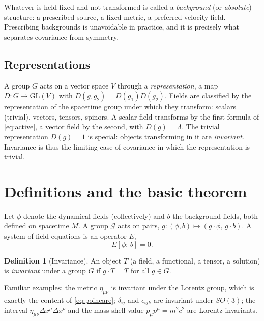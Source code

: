 \documentclass[11pt,a4paper,openany]{book}
\theoremstyle{definition}
\newtheorem{definition}{Definition}[chapter]
\theoremstyle{plain}
\theoremstyle{remark}
\begin{document}
Whatever is held fixed and not transformed is called a \emph{background} (or
\emph{absolute}) structure: a prescribed source, a fixed metric, a preferred
velocity field. Prescribing backgrounds is unavoidable in practice, and it is
precisely what separates covariance from symmetry.

\subsection{Representations}

A group $G$ acts on a vector space $V$ through a \emph{representation},
a map $D\colon G\to \mathrm{GL}(V)$ with $D(g_1g_2)=D(g_1)D(g_2)$.
Fields are classified by the representation of the spacetime group under
which they transform: scalars (trivial), vectors, tensors, spinors. A scalar
field transforms by the first formula of \eqref{eq:active}, a vector field by
the second, with $D(g)=\Lambda$. The trivial representation $D(g)=1$ is
special: objects transforming in it are \emph{invariant}. Invariance is thus
the limiting case of covariance in which the representation is trivial.

\section{Definitions and the basic theorem}
\label{sec:definitions}

Let $\phi$ denote the dynamical fields (collectively) and $b$ the background
fields, both defined on spacetime $M$. A group $\mathcal G$ acts on pairs,
$g\colon(\phi,b)\mapsto(g\cdot\phi,\,g\cdot b)$. A system of field equations
is an operator $E$,
\begin{equation}\label{eq:EOM}
  E[\phi;\,b]=0 .
\end{equation}

\begin{definition}[Invariance]\label{def:invariance}
An object $T$ (a field, a functional, a tensor, a solution) is
\emph{invariant} under a group $G$ if $g\cdot T=T$ for all $g\in G$.
\end{definition}

Familiar examples: the metric $\eta_{\mu\nu}$ is invariant under the
Lorentz group, which is exactly the content of \eqref{eq:poincare}; $\delta_{ij}$
and $\epsilon_{ijk}$ are invariant under $SO(3)$; the interval
$\eta_{\mu\nu}\Delta x^\mu\Delta x^\nu$ and the mass-shell value
$p_\mu p^\mu=m^2c^2$ are Lorentz invariants.
\end{document}
